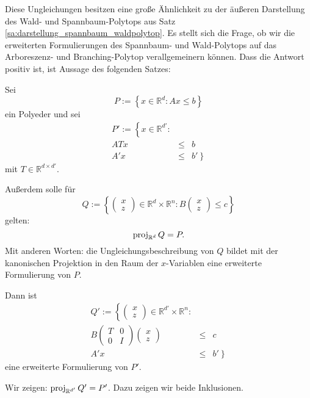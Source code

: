 \documentclass[10p,a4paper,BCOR = 12mm, DIV=15]{scrbook}
\begin{document}
{Diese Ungleichungen besitzen eine große Ähnlichkeit zu der äußeren Darstellung des Wald- und Spannbaum-Polytops aus Satz \ref{sa:darstellung_spannbaum_waldpolytop}. Es stellt sich die Frage, ob wir die erweiterten Formulierungen des Spannbaum- und Wald-Polytops auf das Arboreszenz- und Branching-Polytop verallgemeinern können. Dass die Antwort positiv ist, ist Aussage des folgenden Satzes:

\begin{Sa}
\label{sa:grundlage_arboreszenz_erw}
Sei
\begin{displaymath}
P := \left\{x \in \mathbb{R}^d: A x \leq b\right\} 
\end{displaymath}
ein Polyeder und sei
\begin{eqnarray*}
P' := \left\{x \in \mathbb{R}^{d'}: \right. & & \\
A T x & \leq & b \\
A' x & \leq & \left. b' \right\} 
\end{eqnarray*}
mit $T \in \mathbb{R}^{d \times d'}$.

Außerdem solle für
\begin{displaymath}
Q := \left\{\left(\begin{array}{c}
x \\
z
\end{array}\right) \in \mathbb{R}^d \times \mathbb{R}^n : B \left(\begin{array}{c}
x \\
z
\end{array}\right) \leq c\right\} 
\end{displaymath}
gelten:
\begin{displaymath}
\operatorname{proj}_{\mathbb{R}^d} Q = P.
\end{displaymath}
Mit anderen Worten: die Ungleichungsbeschreibung von $Q$ bildet mit der kanonischen Projektion in den Raum der $x$-Variablen eine erweiterte Formulierung von $P$.

Dann ist
\begin{eqnarray*}
Q' := \left\{\left(\begin{array}{c}
x \\
z
\end{array}\right) \in \mathbb{R}^{d'} \times \mathbb{R}^{n}: \right. & & \\
B \left(\begin{array}{cc}
T & 0 \\
0 & I
\end{array}\right) \left(\begin{array}{c}
x \\
z
\end{array}\right) & \leq & c \\
A' x & \leq & \left. b' \right\} 
\end{eqnarray*}
eine erweiterte Formulierung von $P'$.
\end{Sa}
\begin{bew}
Wir zeigen: $\operatorname{proj}_{\mathbb{R}^{d'}} Q' = P'$. Dazu zeigen wir beide Inklusionen.


\end{bew}}
\end{document}
